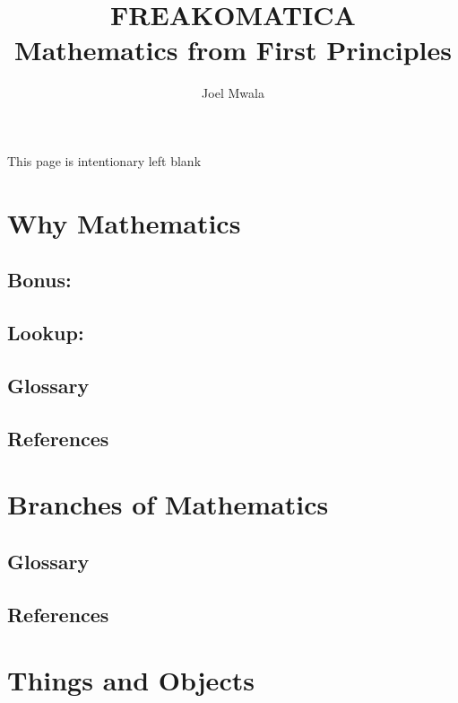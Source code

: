 \documentclass[12pt]{book}
\title{FREAKOMATICA \\\huge{Mathematics from First Principles}}
\author{Joel Mwala}
\begin{document}
\frontmatter
\maketitle
\newpage
\begin{center}
    This page is intentionary left blank
\end{center}

\newpage





\tableofcontents
\newpage



\mainmatter
\chapter{Why Mathematics} %

\section{Bonus: }%
\section{Lookup: }%
\section{Glossary}
\section{References}
\newpage

\chapter{Branches of Mathematics}%
\section{Glossary}
\section{References}
\newpage

\chapter{Things and Objects}%
\end{document}

